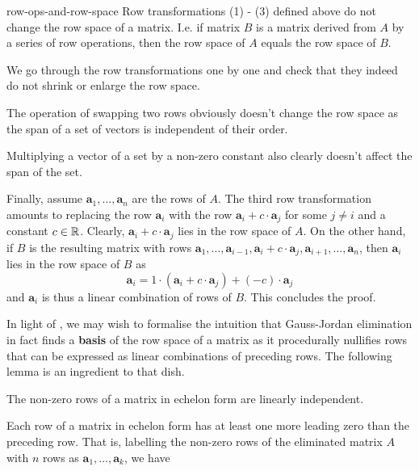 \begin{lemma}{}{row-ops-and-row-space}
 Row transformations (1) - (3) defined above 
 do not change the row space of a matrix. I.e. if matrix $B$ is a matrix derived
 from $A$ by a series of row operations, then the row space of $A$ equals the
 row space of $B$.
\end{lemma}
\begin{lemproof}
 We go through the row transformations one by one and check that they indeed do
 not shrink or enlarge the row space.

 The operation of swapping two rows obviously doesn't change the row space as
 the span of a set of vectors is independent of their order.

 Multiplying a vector of a set by a non-zero constant also clearly doesn't
 affect the span of the set. 

 Finally, assume $\mathbf{a}_1,\ldots,\mathbf{a}_n$ are the rows of $A$. The
 third row transformation amounts to replacing the row $\mathbf{a}_i$ with the
 row $\mathbf{a}_i + c \cdot \mathbf{a}_j$ for some $j \neq i$ and a constant
 $c \in \mathbb{R}$. Clearly, $\mathbf{a}_i + c \cdot \mathbf{a}_j$ lies in the row
 space of $A$. On the other hand, if $B$ is the resulting matrix with rows
 $\mathbf{a}_1,\ldots,\mathbf{a}_{i-1},\mathbf{a}_i + c \cdot \mathbf{a}_j,
 \mathbf{a}_{i+1},\ldots,\mathbf{a}_n$, then $\mathbf{a}_i$ lies in the row
 space of $B$ as
 \[
  \mathbf{a}_i = 1 \cdot (\mathbf{a}_i + c \cdot \mathbf{a}_j) + (-c) \cdot
  \mathbf{a}_j
 \]
 and $\mathbf{a}_i$ is thus a linear combination of rows of $B$. This concludes
 the proof.
\end{lemproof}

In light of , we may wish to formalise
the intuition that Gauss-Jordan elimination in fact finds a \textbf{basis} of
the row space of a matrix as it procedurally nullifies rows that can be
expressed as linear combinations of preceding rows. The following lemma is an
ingredient to that dish.

\begin{lemma}{}{}
 The non-zero rows of a matrix in echelon form are linearly independent.
\end{lemma}
\begin{lemproof}
 Each row of a matrix in echelon form has at least one more leading zero than
 the preceding row. That is, labelling the non-zero rows of the eliminated
 matrix $A$ with $n$ rows as $\mathbf{a}_1,\ldots,\mathbf{a}_k$, we have
\end{lemproof}

